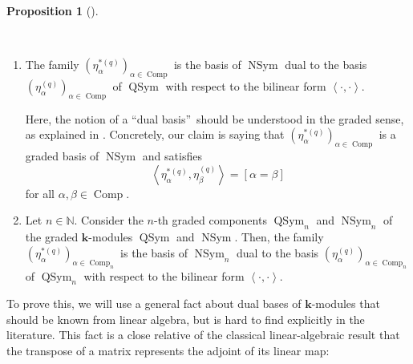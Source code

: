 \documentclass[numbers=enddot,12pt,final,onecolumn,notitlepage]{scrartcl}%
\theoremstyle{definition}
\newtheorem{prop}[theo]{Proposition}
\newenvironment{proposition}[1][]
{\begin{prop}[#1]\begin{leftbar}}
{\end{leftbar}\end{prop}}
\begin{document}
\begin{proposition}
\label{prop.etastar-dual-basis}\ \ 

\begin{enumerate}
\item[\textbf{(a)}] The family $\left(  \eta_{\alpha}^{\ast\left(  q\right)
}\right)  _{\alpha\in\operatorname*{Comp}}$ is the basis of
$\operatorname*{NSym}$ dual to the basis $\left(  \eta_{\alpha}^{\left(
q\right)  }\right)  _{\alpha\in\operatorname*{Comp}}$ of $\operatorname*{QSym}%
$ with respect to the bilinear form $\left\langle \cdot,\cdot\right\rangle $.

Here, the notion of a \textquotedblleft dual basis\textquotedblright\ should
be understood in the graded sense, as explained in \cite[\S 1.6]{GriRei}.
Concretely, our claim is saying that $\left(  \eta_{\alpha}^{\ast\left(
q\right)  }\right)  _{\alpha\in\operatorname*{Comp}}$ is a graded basis of
$\operatorname*{NSym}$ and satisfies
\begin{equation}
\left\langle \eta_{\alpha}^{\ast\left(  q\right)  },\eta_{\beta}^{\left(
q\right)  }\right\rangle =\left[  \alpha=\beta\right]
\label{eq.prop.etastar-dual-basis.duality}%
\end{equation}
for all $\alpha,\beta\in\operatorname*{Comp}$.

\item[\textbf{(b)}] Let $n\in\mathbb{N}$. Consider the $n$-th graded
components $\operatorname*{QSym}\nolimits_{n}$ and $\operatorname*{NSym}%
\nolimits_{n}$ of the graded $\mathbf{k}$-modules $\operatorname*{QSym}$ and
$\operatorname*{NSym}$. Then, the family $\left(  \eta_{\alpha}^{\ast\left(
q\right)  }\right)  _{\alpha\in\operatorname*{Comp}\nolimits_{n}}$ is the
basis of $\operatorname*{NSym}\nolimits_{n}$ dual to the basis $\left(
\eta_{\alpha}^{\left(  q\right)  }\right)  _{\alpha\in\operatorname*{Comp}%
\nolimits_{n}}$ of $\operatorname*{QSym}\nolimits_{n}$ with respect to the
bilinear form $\left\langle \cdot,\cdot\right\rangle $.
\end{enumerate}
\end{proposition}

To prove this, we will use a general fact about dual bases of $\mathbf{k}%
$-modules that should be known from linear algebra, but is hard to find
explicitly in the literature. This fact is a close relative of the classical
linear-algebraic result that the transpose of a matrix represents the adjoint
of its linear map:
\end{document}
